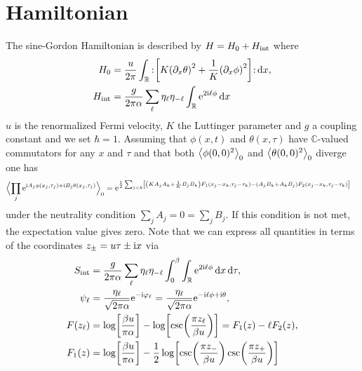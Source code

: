 \documentclass[english, parskip=full]{scrartcl}
\title{\titel}
\author{\autor}
\date{\today}
\begin{document}
\maketitle  %

\section{Hamiltonian}
The sine-Gordon Hamiltonian is described by $H=H_0+H_\Text{int}$ where
\begin{align}
H_0 &= \frac{u}{2\pi} \intr{\normord{\klb*{K\kla*{\partial_x\theta}^2 + \frac{1}{K} \kla*{\partial_x\phi}^2}}}{x},\\
H_\Text{int} &= \frac{g}{2\pi\alpha} \sum_\ell \eta_{\ell}\eta_{-\ell} \intr{\powe{2\i\ell \phi}}{x}
\end{align}
$u$ is the renormalized Fermi velocity, $K$ the Luttinger parameter and $g$ a coupling constant and we set $\hbar=1$.
Assuming that $\phi(x,t)$ and $\theta(x,\tau)$ have $\mathbb{C}$-valued commutators for any $x$ and $\tau$ and that both $\bra*{\phi(0,0)^2}_0$ and $\bra*{\theta(0,0)^2}_0$ diverge one has
\begin{align}
\bra[\Big]{\prod_j \powe{\i A_j\phi(x_j,\tau_j) + \i B_j\theta(x_j,\tau_j)}}_0 &= \powe{\frac{1}{2} \sum_{j<k} \klb*{\kla*{K A_jA_k + \frac{1}{K} B_jB_k} F_1(x_j-x_k,\tau_j-\tau_k) - \kla*{A_jB_k + A_kB_j} F_2(x_j-x_k,\tau_j-\tau_k)}}
\end{align}
under the neutrality condition $\sum_jA_j=0=\sum_jB_j$.
If this condition is not met, the expectation value gives zero.
Note that we can express all quantities in terms of the coordinates $z_\pm = u\tau \pm \i x$ via
\begin{align}
S_\Text{int} &= \frac{g}{2\pi\alpha} \sum_\ell \eta_\ell \eta_{-\ell} \intx{0}{\beta}{\intr{\powe{2\i\ell\phi}}{x}}{\tau},\\
\psi_\ell &= \frac{\eta_\ell}{\sqrt{2\pi\alpha}} \powe{-\i\varphi_\ell} = \frac{\eta_\ell}{\sqrt{2\pi\alpha}} \powe{-\i \ell \phi + \i \theta},\\
F(z_\ell) &= \log\klb*{\frac{\beta u}{\pi\alpha}} - \log\klb*{\csc\kla*{\frac{\pi z_\ell}{\beta u}}} = F_1(z) - \ell F_2(z),\\
F_1(z) &= \log\klb*{
\frac{\beta u}{\pi\alpha}} - \frac{1}{2}\log\klb*{ \csc\kla*{\frac{\pi z_-}{\beta u}} \csc\kla*{\frac{\pi z_+}{\beta u}}}
\end{align}
\end{document}
